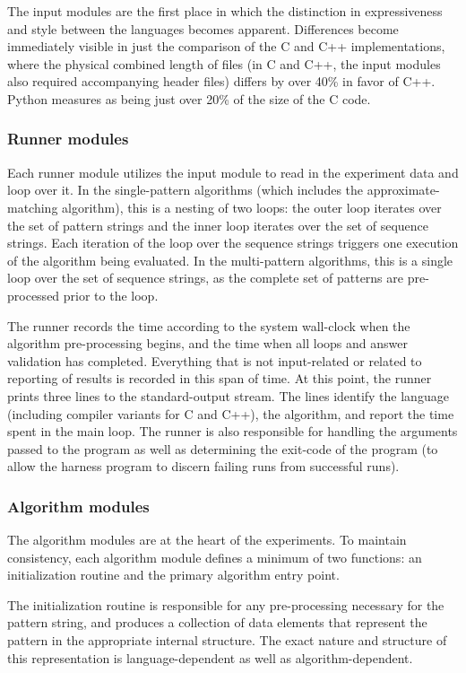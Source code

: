 The input modules are the first place in which the distinction in expressiveness and style between the languages becomes apparent. Differences become immediately visible in just the comparison of the C and C++ implementations, where the physical combined length of files (in C and C++, the input modules also required accompanying header files) differs by over 40\% in favor of C++. Python measures as being just over 20\% of the size of the C code.

\subsubsection{Runner modules}

Each runner module utilizes the input module to read in the experiment data and loop over it. In the single-pattern algorithms (which includes the approximate-matching algorithm), this is a nesting of two loops: the outer loop iterates over the set of pattern strings and the inner loop iterates over the set of sequence strings. Each iteration of the loop over the sequence strings triggers one execution of the algorithm being evaluated. In the multi-pattern algorithms, this is a single loop over the set of sequence strings, as the complete set of patterns are pre-processed prior to the loop.

The runner records the time according to the system wall-clock when the algorithm pre-processing begins, and the time when all loops and answer validation has completed. Everything that is not input-related or related to reporting of results is recorded in this span of time. At this point, the runner prints three lines to the standard-output stream. The lines identify the language (including compiler variants for C and C++), the algorithm, and report the time spent in the main loop. The runner is also responsible for handling the arguments passed to the program as well as determining the exit-code of the program (to allow the harness program to discern failing runs from successful runs).

\subsubsection{Algorithm modules}

The algorithm modules are at the heart of the experiments. To maintain consistency, each algorithm module defines a minimum of two functions: an initialization routine and the primary algorithm entry point.

The initialization routine is responsible for any pre-processing necessary for the pattern string, and produces a collection of data elements that represent the pattern in the appropriate internal structure. The exact nature and structure of this representation is language-dependent as well as algorithm-dependent.


